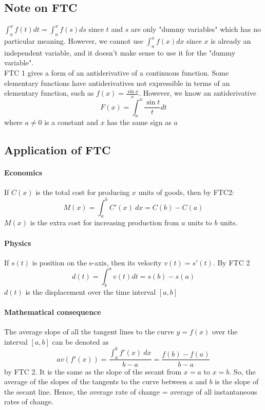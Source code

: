 \documentclass[12pt]{article}
\begin{document}
\subsection{Note on FTC} $\int_a^x f(t) dt = \int_a^x f(s) ds$ since $t$ and $s$ are only "dummy variables" which has no particular meaning. However, we cannot use
$\int_a^x f(x) dx$ since $x$ is already an independent variable, and it doesn't make sense to use it for the "dummy variable". \\

\noindent
FTC 1 gives a form of an antiderivative of a continuous function. Some elementary functions have antiderivatives not expressible in terms of
an elementary function, such as $f(x) = \frac{\sin x}{x}$. However, we know an antiderivative
\[
    F(x) = \int_a^x \frac{\sin t}{t} dt
\]
where $a \neq 0$ is a constant and $x$ has the same sign as $a$

\subsection{Application of FTC}
\paragraph{Economics} If $C(x)$ is the total cost for producing $x$ units of goods, then by FTC2:
\[
    M(x) = \int_a^b C'(x)\:  dx = C(b) - C(a)
\]
$M(x)$ is the extra cost for increasing production from $a$ units to $b$ units.

\paragraph{Physics} If $s(t)$ is position on the s-axis, then its velocity $v(t) = s'(t)$. By FTC 2
\[
    d(t) = \int_b^a v(t)   d t = s(b) - s(a)
\]
$d(t)$ is the displacement over the time interval $[a, b]$
\paragraph{Mathematical consequence} The average slope of all the tangent lines to the curve $y = f(x)$ over the interval $[a, b]$ can be denoted as
\[
    av(f'(x)) = \frac{\int_a^b f'(x)\: dx}{b - a} = \frac{f(b) - f(a)}{b - a} 
\]
by FTC 2. It is the same as the slope of the secant from $x = a$ to $x = b$. So, the average of the slopes of the tangents to the curve 
between $a$ and $b$ is the slope of the secant line. Hence, the average rate of change = average of all instantaneous rates of change.
\end{document}
